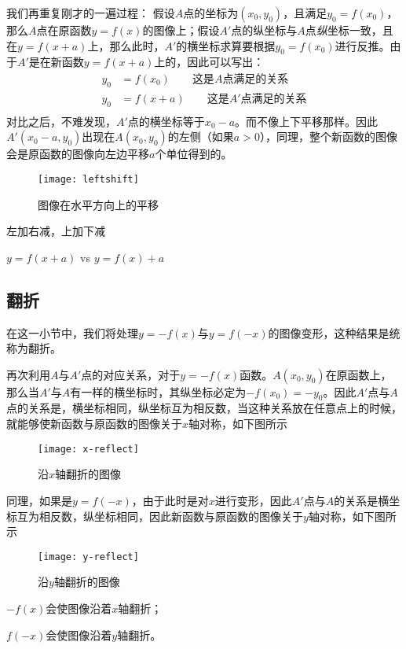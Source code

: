 我们再重复刚才的一遍过程：
假设$A$点的坐标为$(x_0,y_0)$，且满足$y_0=f(x_0)$，那么$A$点在原函数$y=f(x)$的图像上；假设$A'$点的纵坐标与$A$点\emph{纵}坐标一致，且在$y=f(x+a)$上，那么此时，$A'$的横坐标求算要根据$y_0=f(x_0)$进行反推。由于$A'$是在新函数$y=f(x+a)$上的，因此可以写出：
\begin{align*}
y_0 &= f(x_0) \qquad \text{这是}A\text{点满足的关系}\\
y_0 &= f(x+a) \qquad \text{这是}A'\text{点满足的关系}\\
\end{align*}
对比之后，不难发现，$A'$点的横坐标等于$x_0-a$。而不像上下平移那样。因此$A'(x_0-a,y_0)$出现在$A(x_0,y_0)$的左侧（如果$a>0$），同理，整个新函数的图像会是原函数的图像向左边平移$a$个单位得到的。

\begin{figure}[H]
\centering
\texttt{[image: leftshift]}
\caption{图像在水平方向上的平移}
\end{figure}

\begin{SummBox}
左加右减，上加下减

$y=f(x+a)$ vs $y=f(x)+a$
\end{SummBox}


\subsection*{翻折}
\label{subsec:Reflection}
在这一小节中，我们将处理$y=-f(x)$与$y=f(-x)$的图像变形，这种结果是统称为翻折。

再次利用$A$与$A'$点的对应关系，对于$y=-f(x)$函数。$A(x_0,y_0)$在原函数上，那么当$A'$与$A$有一样的横坐标时，其纵坐标必定为$-f(x_0)=-y_0$。因此$A'$点与$A$点的关系是，横坐标相同，纵坐标互为相反数，当这种关系放在任意点上的时候，就能够使新函数与原函数的图像关于$x$轴对称，如下图所示
\begin{figure}[H]
\centering
\texttt{[image: x-reflect]}
\caption{沿$x$轴翻折的图像}
\end{figure}

同理，如果是$y=f(-x)$，由于此时是对$x$进行变形，因此$A'$点与$A$的关系是横坐标互为相反数，纵坐标相同，因此新函数与原函数的图像关于$y$轴对称，如下图所示
\begin{figure}[H]
\centering
\texttt{[image: y-reflect]}
\caption{沿$y$轴翻折的图像}
\end{figure}

\begin{SummBox}
$-f(x)$会使图像沿着$x$轴翻折；

$f(-x)$会使图像沿着$y$轴翻折。
\end{SummBox}

